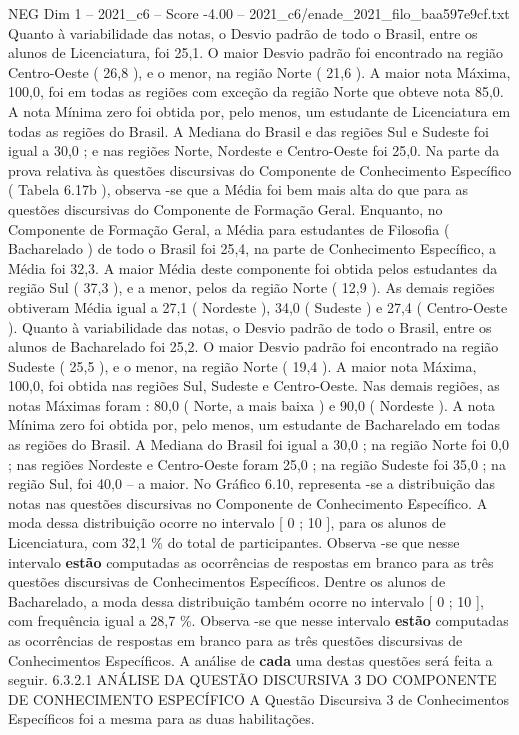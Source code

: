 \begin{textsample}{NEG Dim 1 – 2021\_c6 – Score -4.00 – 2021\_c6/enade\_2021\_filo\_baa597e9cf.txt}
Quanto à variabilidade das notas, o Desvio padrão de todo o Brasil, entre os alunos de Licenciatura, foi 25,1.
O maior Desvio padrão foi encontrado na região Centro-Oeste ( 26,8 ), e o menor, na região Norte ( 21,6 ).
A maior nota Máxima, 100,0, foi em todas as regiões com exceção da região Norte que obteve nota 85,0.
A nota Mínima zero foi obtida por, pelo menos, um estudante de Licenciatura em todas as regiões do Brasil.
A Mediana do Brasil e das regiões Sul e Sudeste foi igual a 30,0 ; e nas regiões Norte, Nordeste e Centro-Oeste foi 25,0.
Na parte da prova relativa às questões discursivas do Componente de Conhecimento Específico ( Tabela 6.17b ), observa -se que a Média foi bem mais alta do que para as questões discursivas do Componente de Formação Geral.
Enquanto, no Componente de Formação Geral, a Média para estudantes de Filosofia ( Bacharelado ) de todo o Brasil foi 25,4, na parte de Conhecimento Específico, a Média foi 32,3.
A maior Média deste componente foi obtida pelos estudantes da região Sul ( 37,3 ), e a menor, pelos da região Norte ( 12,9 ).
As demais regiões obtiveram Média igual a 27,1 ( Nordeste ), 34,0 ( Sudeste ) e 27,4 ( Centro-Oeste ).
Quanto à variabilidade das notas, o Desvio padrão de todo o Brasil, entre os alunos de Bacharelado foi 25,2.
O maior Desvio padrão foi encontrado na região Sudeste ( 25,5 ), e o menor, na região Norte ( 19,4 ).
A maior nota Máxima, 100,0, foi obtida nas regiões Sul, Sudeste e Centro-Oeste.
Nas demais regiões, as notas Máximas foram : 80,0 ( Norte, a mais baixa ) e 90,0 ( Nordeste ).
A nota Mínima zero foi obtida por, pelo menos, um estudante de Bacharelado em todas as regiões do Brasil.
A Mediana do Brasil foi igual a 30,0 ; na região Norte foi 0,0 ; nas regiões Nordeste e Centro-Oeste foram 25,0 ; na região Sudeste foi 35,0 ; na região Sul, foi 40,0 – a maior.
No Gráfico 6.10, representa -se a distribuição das notas nas questões discursivas no Componente de Conhecimento Específico.
A moda dessa distribuição ocorre no intervalo [ 0 ; 10 ], para os alunos de Licenciatura, com 32,1 \% do total de participantes.
Observa -se que nesse intervalo \textbf{estão} computadas as ocorrências de respostas em branco para as três questões discursivas de Conhecimentos Específicos.
Dentre os alunos de Bacharelado, a moda dessa distribuição também ocorre no intervalo [ 0 ; 10 ], com frequência igual a 28,7 \%.
Observa -se que nesse intervalo \textbf{estão} computadas as ocorrências de respostas em branco para as três questões discursivas de Conhecimentos Específicos.
A análise de \textbf{cada} uma destas questões será feita a seguir. 6.3.2.1 ANÁLISE DA QUESTÃO DISCURSIVA 3 DO COMPONENTE DE CONHECIMENTO ESPECÍFICO A Questão Discursiva 3 de Conhecimentos Específicos foi a mesma para as duas habilitações.

\end{textsample}
